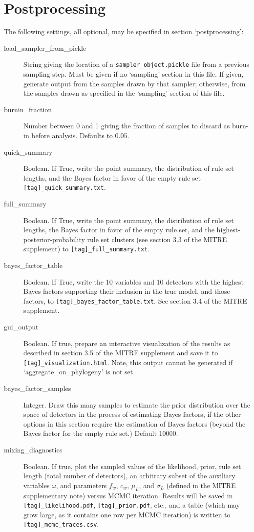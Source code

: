 \documentclass[12pt]{report}
\begin{document}
\section{Postprocessing}\label{postprocessing}
The following settings, all optional, may be specified in section `postprocessing':
\begin{description}
  \item[load\_sampler\_from\_pickle] String giving the location of a
    \texttt{sampler\_object.pickle} file from a previous sampling
    step. Must be given if no `sampling' section in this file. If
    given, generate output from the samples drawn by that sampler;
    otherwise, from the samples drawn as specified in the `sampling'
    section of this file.
  \item[burnin\_fraction] Number between 0 and 1 giving the fraction of
    samples to discard as burn-in before analysis. Defaults to 0.05. 
  \item[quick\_summary] Boolean. If True, write the point summary,
    the distribution of rule set lengths, and the Bayes factor in
    favor of the empty rule set 
    \texttt{[tag]\_quick\_summary.txt}.
  \item[full\_summary] Boolean. If True, write the point summary,
    the distribution of rule set lengths, the Bayes factor in
    favor of the empty rule set, and the highest-posterior-probability
    rule set clusters (see section 3.3 of the MITRE supplement) to 
    \texttt{[tag]\_full\_summary.txt}.
  \item[bayes\_factor\_table] Boolean. If True, write the 10 variables
    and 10 detectors with the highest Bayes factors supporting their
    inclusion in the true model, and those factors, to
    \texttt{[tag]\_bayes\_factor\_table.txt}. See section 3.4 of the
    MITRE supplement.
  \item[gui\_output] Boolean. If true, prepare an interactive
    visualization of the results as described in section 3.5 of the
    MITRE supplement and save it to
    \texttt{[tag]\_visualization.html}. Note, this output cannot be
    generated if `aggregate\_on\_phylogeny' is not set.
  \item[bayes\_factor\_samples] Integer. Draw this many samples
    to estimate the prior distribution over the space of detectors in the
    process of estimating Bayes factors, if the other options in this
    section require the estimation of Bayes factors (beyond the
    Bayes factor for the empty rule set.) Default 10000.
  \item[mixing\_diagnostics] Boolean. If true, plot the sampled values
    of the likelihood, prior, rule set length (total number of
    detectors), an arbitrary subset of the auxiliary variables
    $\omega$, and parameters $f_w$, $c_w$, $\mu_L$, and $\sigma_L$
    (defined in the MITRE supplementary note) versus MCMC
    iteration. Results will be saved in
    \texttt{[tag]\_likelihood.pdf}, \texttt{[tag]\_prior.pdf}, etc.,
    and a table (which may grow large, as it contains one row per
    MCMC iteration) is written to 
    \texttt{[tag]\_mcmc\_traces.csv}.
    
\end{description}
\end{document}
